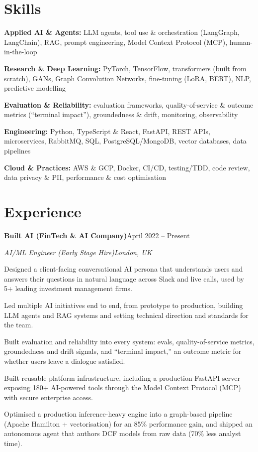 \documentclass[10pt,a4paper]{article}
\newcommand{\entry}[4]{%
  {\color{company}\bfseries #1}\hfill {\color{muted}#2}\par
  \vspace{1pt}
  {\itshape #3}\hfill {\color{muted}\itshape #4}\par
  \vspace{3pt}%
}
\begin{document}
\section{Skills}
\begin{tight}
  \item[\textcolor{accent}{\small$\bullet$}] \textbf{Applied AI \& Agents:} LLM agents, tool use \& orchestration (LangGraph, LangChain), RAG, prompt engineering, Model Context Protocol (MCP), human-in-the-loop
  \item[\textcolor{accent}{\small$\bullet$}] \textbf{Research \& Deep Learning:} PyTorch, TensorFlow, transformers (built from scratch), GANs, Graph Convolution Networks, fine-tuning (LoRA, BERT), NLP, predictive modelling
  \item[\textcolor{accent}{\small$\bullet$}] \textbf{Evaluation \& Reliability:} evaluation frameworks, quality-of-service \& outcome metrics (``terminal impact''), groundedness \& drift, monitoring, observability
  \item[\textcolor{accent}{\small$\bullet$}] \textbf{Engineering:} Python, TypeScript \& React, FastAPI, REST APIs, microservices, RabbitMQ, SQL, PostgreSQL/MongoDB, vector databases, data pipelines
  \item[\textcolor{accent}{\small$\bullet$}] \textbf{Cloud \& Practices:} AWS \& GCP, Docker, CI/CD, testing/TDD, code review, data privacy \& PII, performance \& cost optimisation
\end{tight}

\section{Experience}
\entry{Built AI (FinTech \& AI Company)}{April 2022 -- Present}{AI/ML Engineer (Early Stage Hire)}{London, UK}
\begin{tight}
  \item Designed a client-facing conversational AI persona that understands users and answers their questions in natural language across Slack and live calls, used by 5+ leading investment management firms.
  \item Led multiple AI initiatives end to end, from prototype to production, building LLM agents and RAG systems and setting technical direction and standards for the team.
  \item Built evaluation and reliability into every system: evals, quality-of-service metrics, groundedness and drift signals, and ``terminal impact,'' an outcome metric for whether users leave a dialogue satisfied.
  \item Built reusable platform infrastructure, including a production FastAPI server exposing 180+ AI-powered tools through the Model Context Protocol (MCP) with secure enterprise access.
  \item Optimised a production inference-heavy engine into a graph-based pipeline (Apache Hamilton + vectorisation) for an 85\% performance gain, and shipped an autonomous agent that authors DCF models from raw data (70\% less analyst time).
\end{tight}
\end{document}
